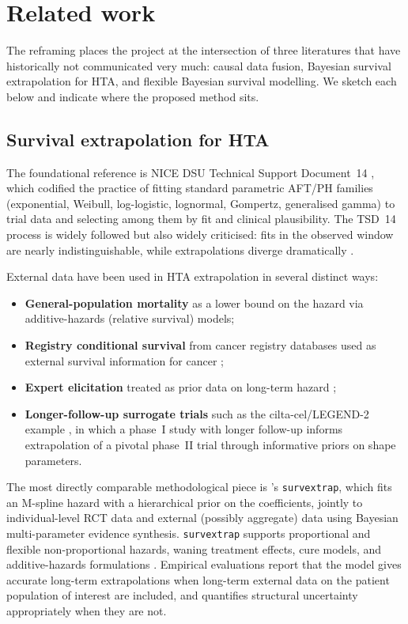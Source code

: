 \documentclass[11pt]{article}
\begin{document}
\section{Related work}

The reframing places the project at the intersection of three literatures
that have historically not communicated very much: causal data fusion,
Bayesian survival extrapolation for HTA, and flexible Bayesian survival
modelling. We sketch each below and indicate where the proposed method sits.

\subsection{Survival extrapolation for HTA}

The foundational reference is NICE DSU Technical Support Document~14
\citep{Latimer2013}, which codified the practice of fitting standard
parametric AFT/PH families (exponential, Weibull, log-logistic, lognormal,
Gompertz, generalised gamma) to trial data and selecting among them by
fit and clinical plausibility. The TSD~14 process is widely followed but
also widely criticised: fits in the observed window are nearly
indistinguishable, while extrapolations diverge dramatically
\citep{BellGorrod2019, Bagust2014}.

External data have been used in HTA extrapolation in several distinct ways:
\begin{itemize}[leftmargin=*]
  \item \textbf{General-population mortality} as a lower bound on the
        hazard via additive-hazards (relative survival) models;
  \item \textbf{Registry conditional survival} from cancer registry
        databases used as external survival information for cancer
        \citep{Guyot2017};
  \item \textbf{Expert elicitation} treated as prior data on long-term hazard
        \citep{Guyot2017};
  \item \textbf{Longer-follow-up surrogate trials} such as the
        cilta-cel/LEGEND-2 example \citep{Vyas2023}, in which a phase~I
        study with longer follow-up informs extrapolation of a pivotal
        phase~II trial through informative priors on shape parameters.
\end{itemize}

The most directly comparable methodological piece is \citet{Jackson2023}'s
\texttt{survextrap}, which fits an M-spline hazard with a hierarchical prior
on the coefficients, jointly to individual-level RCT data and external
(possibly aggregate) data using Bayesian multi-parameter evidence synthesis.
\texttt{survextrap} supports proportional and flexible non-proportional
hazards, waning treatment effects, cure models, and additive-hazards
formulations \citep{Jackson2023}. Empirical evaluations
\citep{Timmins2025} report that the model gives accurate long-term
extrapolations when long-term external data on the patient population of
interest are included, and quantifies structural uncertainty appropriately
when they are not.
\end{document}
